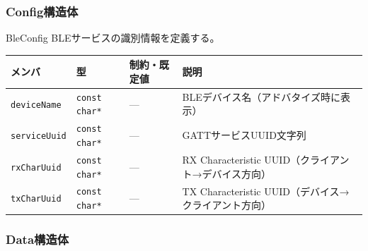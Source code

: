 \subsubsection{Config構造体}

\begin{funcblock}{BleConfig}
BLEサービスの識別情報を定義する。

\begin{longtable}{l l l p{4.5cm}}
\toprule
\textbf{メンバ} & \textbf{型} & \textbf{制約・既定値} & \textbf{説明} \\
\midrule
\endhead
\texttt{deviceName}  & \texttt{const char*} & ---  & BLEデバイス名（アドバタイズ時に表示） \\
\texttt{serviceUuid} & \texttt{const char*} & ---  & GATTサービスUUID文字列 \\
\texttt{rxCharUuid}  & \texttt{const char*} & ---  & RX Characteristic UUID（クライアント→デバイス方向） \\
\texttt{txCharUuid}  & \texttt{const char*} & ---  & TX Characteristic UUID（デバイス→クライアント方向） \\
\bottomrule
\end{longtable}
\end{funcblock}

\subsubsection{Data構造体}

